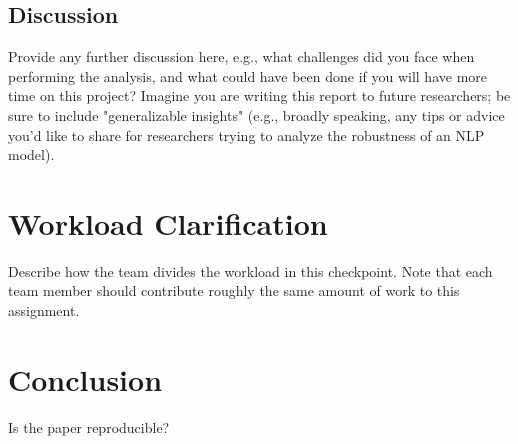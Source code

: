 \documentclass[11pt,a4paper]{article}
\begin{document}
\subsection{Discussion} 
Provide any further discussion here, e.g., what challenges did you face when performing the analysis, and what could have been done if you will have more time on this project? Imagine you are writing this report to future researchers; be sure to include "generalizable insights" (e.g., broadly speaking, any tips or advice you'd like to share for researchers trying to analyze the robustness of an NLP model).

\section{Workload Clarification}
Describe how  the team divides the workload in this checkpoint. Note that each team member should contribute roughly the same amount of work to this assignment.

\section{Conclusion}
Is the paper reproducible?


\end{document}
